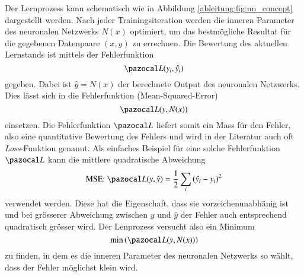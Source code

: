 Der Lernprozess kann schematisch wie in Abbildung
\ref{ableitung:fig:nn_concept} dargestellt werden.
%
Nach jeder Trainingsiteration werden die inneren Parameter des
neuronalen Netzwerks $N(x)$ optimiert, um das bestmögliche Resultat
für die gegebenen Datenpaare $(x,y)$ zu errechnen.
Die Bewertung des aktuellen Lernstands ist mittels der Fehlerfunktion
\begin{equation}
	\Lb(y_{i},\hat{y_i})
\end{equation}
gegeben. Dabei ist
$
\hat{y} = N(x)
$
der berechnete Output des neuronalen Netzwerks.
Dies lässt sich in die Fehlerfunktion (Mean-Squared-Error)
\begin{equation}
\Lb(y,N(x))
\label{ableitung:eqn:loss_net}
\end{equation}
einsetzen.
Die Fehlerfunktion $\Lb$ liefert somit ein Mass für den Fehler,
also eine quantitative Bewertung des Fehlers und wird in der Literatur
auch oft {\em Loss}-Funktion genannt.
%
%
Als einfaches Beispiel für eine solche Fehlerfunktion $\Lb$ kann die
mittlere quadratische Abweichung 
\begin{equation}
\text{MSE: } \Lb (y, \hat{y}) = \frac{1}{2} \sum_i \left( \hat{y_i} - y_i \right)^2
\label{ableitung:eqn:loss}
\end{equation}
verwendet werden. Diese hat die Eigenschaft, dass sie vorzeichenunabhänig ist und bei grösserer Abweichung zwischen $y$ und $\hat{y}$ der Fehler auch entsprechend quadratisch grösser wird.
Der Lenprozess versucht also ein Minimum 
\begin{equation}
	\min \left( \Lb(y,N(x)) \right) 
	\label{ableitung:eqn:min_loss}
\end{equation}
zu finden, in dem es die inneren Parameter des neuronalen Netzwerks so wählt, dass der Fehler möglichst klein wird.
